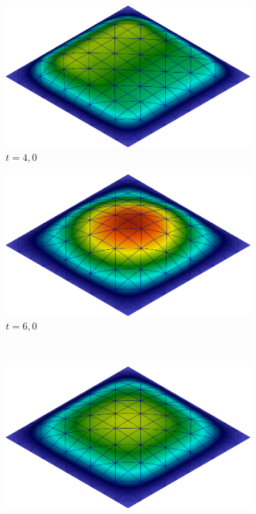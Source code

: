 \begin{figure}[h!]
    \centering
    \caption{Cavidade tridimensional - Deslocamento vertical da casca.}
    \begin{subfigure}[b]{0.35\textwidth}
        \includegraphics[width=\linewidth]{Figuras/FSI-Cavity3D/d4.png}
        \caption{$t=4,0$}
    \end{subfigure}
    \begin{subfigure}[b]{0.35\textwidth}
        \includegraphics[width=\linewidth]{Figuras/FSI-Cavity3D/d6.png}
        \caption{$t=6,0$}
    \end{subfigure}\\
    \begin{subfigure}[b]{0.35\textwidth}
        \includegraphics[width=\linewidth]{Figuras/FSI-Cavity3D/d21-8.png}

\end{subfigure}
\end{figure}
